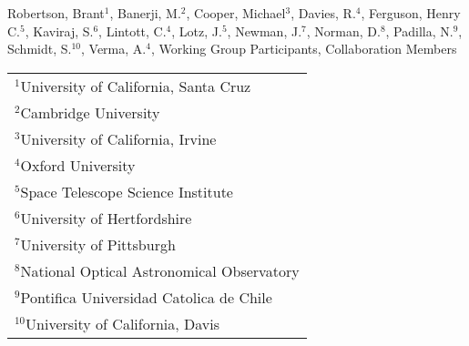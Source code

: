 Robertson, Brant$^{1}$, Banerji, M.$^{2}$, Cooper, Michael$^{3}$, Davies, R.$^{4}$, Ferguson, Henry C.$^{5}$, Kaviraj, S.$^{6}$, Lintott, C.$^{4}$, Lotz, J.$^{5}$, Newman, J.$^{7}$, Norman, D.$^{8}$, Padilla, N.$^{9}$, Schmidt, S.$^{10}$, Verma, A.$^{4}$, Working Group Participants, Collaboration Members

\vspace*{5mm}

\begin{table}[htp]
\centering
{\renewcommand{\arraystretch}{0.8}
\begin{tabular}{p{10cm}}
$^{1}$University of California, Santa Cruz\\
$^{2}$Cambridge University\\
$^{3}$University of California, Irvine\\
$^{4}$Oxford University\\
$^{5}$Space Telescope Science Institute\\
$^{6}$University of Hertfordshire\\
$^{7}$University of Pittsburgh\\
$^{8}$National Optical Astronomical Observatory\\
$^{9}$Pontifica Universidad Catolica de Chile\\
$^{10}$University of California, Davis\\
\end{tabular}
}
\end{table}
